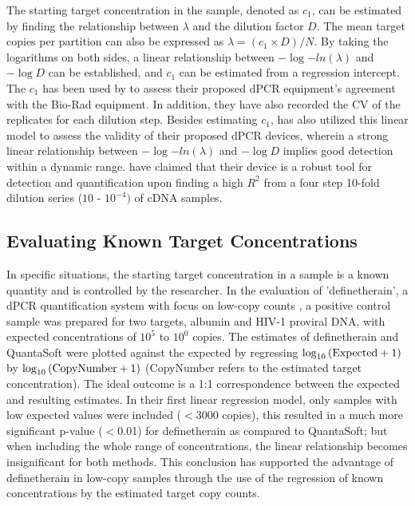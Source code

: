 The starting target concentration in the sample, denoted as \(c_1\), can be estimated by finding the relationship between \(\lambda\) and the dilution factor \(D\). The mean target copies per partition can also be expressed as \(\lambda = (c_1 \times D)/N \). By taking the logarithms on both sides, a linear relationship between \(-\log{-ln(\lambda)}\) and \(-\log{D}\) can be established, and \(c_1\) can be estimated from a regression intercept. The \(c_1\) has been used by  to assess their proposed dPCR equipment's agreement with the Bio-Rad equipment. In addition, they have also recorded the CV of the replicates for each dilution step. Besides estimating \(c_1\),  has also utilized this linear model to assess the validity of their proposed dPCR devices, wherein a strong linear relationship between \(-\log{-ln(\lambda)}\) and \(-\log{D}\) implies good detection within a dynamic range.  have claimed that their device is a robust tool for detection and quantification upon finding a high \(R^2\) from a four step 10-fold dilution series (\(10\) - \(10^{-4})\) of cDNA samples.


\subsection{Evaluating Known Target Concentrations}
\label{sec:ch2_perfeval_essentialMetrics}
In specific situations, the starting target concentration in a sample is a known quantity and is controlled by the researcher. In the evaluation of 'definetherain', a dPCR quantification system with focus on low-copy counts \cite{Jones2014}, a positive control sample was prepared for two targets, albumin and HIV-1 proviral DNA, with expected concentrations of \(10^5\) to \(10^0\) copies. The estimates of definetherain and QuantaSoft were plotted against the expected by regressing \(\log_{10}{(\textup{Expected} + 1)}\) by \(\log_{10}{(\textup{CopyNumber} + 1)}\) (CopyNumber refers to the estimated target concentration). The ideal outcome is a 1:1 correspondence between the expected and resulting estimates. In their first linear regression model, only samples with low expected values were included ($<$3000 copies), this resulted in a much more significant p-value ($<$0.01) for definetherain as compared to QuantaSoft; but when including the whole range of concentrations, the linear relationship becomes insignificant for both methods. This conclusion has supported the advantage of definetherain in low-copy samples through the use of the regression of known concentrations by the estimated target copy counts.

